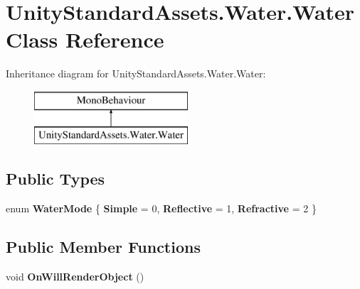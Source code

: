 \hypertarget{class_unity_standard_assets_1_1_water_1_1_water}{}\section{Unity\+Standard\+Assets.\+Water.\+Water Class Reference}
\label{class_unity_standard_assets_1_1_water_1_1_water}
Inheritance diagram for Unity\+Standard\+Assets.\+Water.\+Water\+:\begin{figure}[H]
\begin{center}
\leavevmode
\includegraphics[height=2.000000cm]{class_unity_standard_assets_1_1_water_1_1_water}
\end{center}
\end{figure}
\subsection*{Public Types}
\begin{DoxyCompactItemize}
\item 
enum {\bfseries Water\+Mode} \{ {\bfseries Simple} = 0, 
{\bfseries Reflective} = 1, 
{\bfseries Refractive} = 2
 \}\hypertarget{class_unity_standard_assets_1_1_water_1_1_water_a9e5d3bf13fa82b48b85d9f90f707379e}{}\label{class_unity_standard_assets_1_1_water_1_1_water_a9e5d3bf13fa82b48b85d9f90f707379e}

\end{DoxyCompactItemize}
\subsection*{Public Member Functions}
\begin{DoxyCompactItemize}
\item 
void {\bfseries On\+Will\+Render\+Object} ()\hypertarget{class_unity_standard_assets_1_1_water_1_1_water_acb0ccefbe5352b8cee30e3f5412a0984}{}\label{class_unity_standard_assets_1_1_water_1_1_water_acb0ccefbe5352b8cee30e3f5412a0984}

\end{DoxyCompactItemize}
